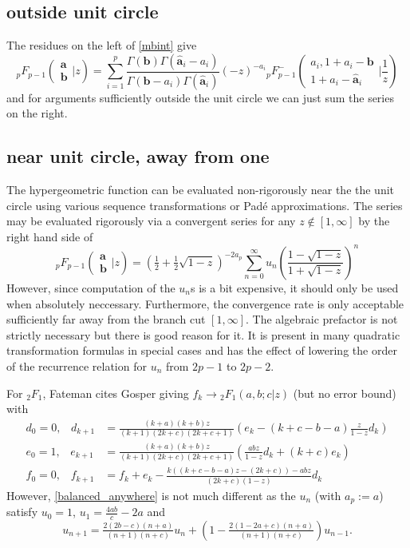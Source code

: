 \documentclass[12pt]{article}
\numberwithin{equation}{section}
\newcommand{\Head}[3] {{}_{#1}{#2}_{#3}}
\newcommand{\FF}[6] {{}_{#1}{#2}_{#3} \left( \begin{array}{c} #4 \\ #5 \end{array} \Big| {#6}  \right)}
\newcommand{\FFe}[7] {{}_{#1}^{\,}{#2}_{#3}^{#4} \left( \begin{array}{c} #5 \\ #6 \end{array} \Big| {#7} \right)}
\begin{document}
\subsection{outside unit circle}
The residues on the left of \eqref{mbint} give
\begin{equation}
\label{balanced_outside}
\FF{p}{F}{p-1}{\mathbf{a}}{\mathbf{b}}{z} = \sum_{i=1}^{p} \frac{\Gamma(\mathbf{b}) \Gamma(\hat{\mathbf{a}}_i-a_i)}{\Gamma(\mathbf{b}-a_i) \Gamma(\hat{\mathbf{a}}_i)} (-z)^{-a_i} \FFe{p}{F}{p-1}{-}{a_i,1+a_i-\mathbf{b}}{1+a_i-\hat{\mathbf{a}}_i}{\frac{1}{z}}
\end{equation}
and for arguments sufficiently outside the unit circle we can just sum the series on the right.

\subsection{near unit circle, away from one}
The hypergeometric function can be evaluated non-rigorously near the the unit circle using various sequence transformations or Pad\'e approximations. The series may be evaluated rigorously via a convergent series for any $z \not \in [1,\infty]$ by the right hand side of
\begin{equation}
\label{balanced_anywhere}
\FF{p}{F}{p-1}{\mathbf{a}}{\mathbf{b}}{z} = (\tfrac12+ \tfrac12 \sqrt{1-z})^{-2 a_p} \sum_{n=0}^{\infty}u_n \left(\frac{1-\sqrt{1-z}}{1+\sqrt{1-z}}\right)^n
\end{equation}
However, since computation of the $u_n$s is a bit expensive, it should only be used when absolutely neccessary. Furthermore, the convergence rate is only acceptable sufficiently far away from the branch cut $[1,\infty]$. The algebraic prefactor is not strictly necessary but there is good reason for it. It is present in many quadratic transformation formulas in special cases and has the effect of lowering the order of the recurrence relation for $u_n$ from $2p-1$ to $2p-2$.

For $\Head{2}{F}{1}$, Fateman cites Gosper giving $f_k \to \Head{2}{F}{1}(a,b;c|z)$ (but no error bound) with 
\begin{equation*}
\begin{aligned}
d_0 = 0\text{,} \quad d_{k+1} & = \tfrac{(k+a)(k+b)z}{(k+1)(2k+c)(2k+c+1)}(e_k-(k+c-b-a)\tfrac{z}{1-z} d_k)\\
e_0 =1\text{,} \quad e_{k+1} & = \tfrac{(k+a)(k+b)z}{(k+1)(2k+c)(2k+c+1)}(\tfrac{a b z}{1-z} d_k+(k+c) e_k)\\
f_0 = 0\text{,} \quad f_{k+1} &= f_{k} + e_k - \tfrac{k((k+c-b-a)z-(2k+c))-a b z}{(2k+c)(1-z)} d_k
\end{aligned}
\end{equation*}
However, \eqref{balanced_anywhere} is not much different as the $u_n$ (with $a_p:=a$) satisfy $u_0 = 1$, $u_1 = \frac{4ab}{c}-2a$ and
\begin{equation*}
u_{n+1} = \tfrac{2(2b-c)(n+a)}{(n+1)(n+c)} u_n + (1-\tfrac{2(1-2a+c)(n+a)}{(n+1)(n+c)}) u_{n-1}\text{.}
\end{equation*}
\end{document}
